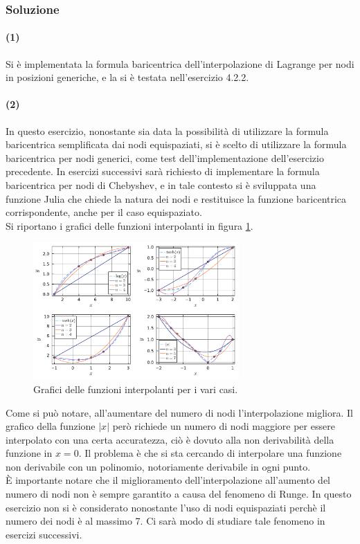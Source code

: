 \documentclass[letterpaper, 12pt]{article}
\numberwithin{equation}{section}    %
\begin{document}
\subsubsection{Soluzione}
\paragraph{(1) } Si è implementata la formula baricentrica dell'interpolazione di Lagrange 
per nodi in posizioni generiche, e la si è testata nell'esercizio 4.2.2.
\paragraph{(2) } In questo esercizio, nonostante sia data la possibilità di utilizzare la formula baricentrica
semplificata dai nodi equispaziati, si è scelto di utilizzare la formula baricentrica per nodi generici, come
test dell'implementazione dell'esercizio precedente. In esercizi successivi sarà richiesto di implementare
la formula baricentrica per nodi di Chebyshev, e in tale contesto si è sviluppata una funzione Julia che
chiede la natura dei nodi e restituisce la funzione baricentrica corrispondente, anche per il caso equispaziato. \\
Si riportano i grafici delle funzioni interpolanti in figura \ref{fig:es4_2_2_1}.
\begin{figure}[!ht]
    \centering
    \includegraphics[width=0.7\textwidth]{4221.pdf}
    \caption{Grafici delle funzioni interpolanti per i vari casi.}
    \label{fig:es4_2_2_1}
\end{figure}

Come si può notare, all'aumentare del numero di nodi l'interpolazione migliora. Il grafico della funzione $|x|$
però richiede un numero di nodi maggiore per essere interpolato con una certa accuratezza, ciò è dovuto alla
non derivabilità della funzione in $x=0$. Il problema è che si sta cercando di interpolare una funzione
non derivabile con un polinomio, notoriamente derivabile in ogni punto. \\
È importante notare che il miglioramento dell'interpolazione all'aumento del numero di nodi non è sempre
garantito a causa del fenomeno di Runge. In questo esercizio non si è considerato
nonostante l'uso di nodi equispaziati perchè il numero dei nodi è al massimo 7. Ci sarà modo di studiare tale 
fenomeno in esercizi successivi.
\end{document}

